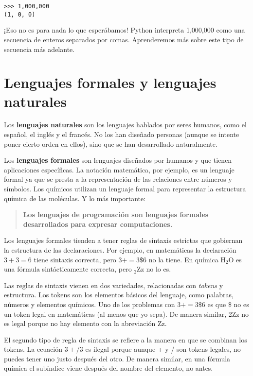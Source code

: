 \documentclass[12pt,letterpaper]{book}
\begin{document}
\begin{lstlisting}
>>> 1,000,000
(1, 0, 0)
\end{lstlisting}

¡Eso no es para nada lo que esperábamos! Python interpreta 1,000,000 como una secuencia de enteros separados por comas. Aprenderemos más sobre este tipo de secuencia más adelante.

\section{Lenguajes formales y lenguajes naturales}

Los \textbf{lenguajes naturales} son los lenguajes hablados por seres humanos, como el español, el inglés y el francés. No los han diseñado personas (aunque se intente poner cierto orden en ellos), sino que se han desarrollado naturalmente.

Los \textbf{lenguajes formales} son lenguajes diseñados por humanos y que tienen aplicaciones específicas. La notación matemática, por ejemplo, es un lenguaje formal ya que se presta a la representación de las relaciones entre números y símbolos. Los químicos utilizan un lenguaje formal para representar la estructura química de las moléculas. Y lo más importante:

\begin{quote}
\textbf{Los lenguajes de programación son lenguajes formales desarrollados para expresar computaciones.}
\end{quote}

Los lenguajes formales tienden a tener reglas de sintaxis estrictas que gobiernan la estructura de las declaraciones. Por ejemplo, en matemáticas la declaración $3 + 3 = 6$ tiene sintaxis correcta, pero $3+ = 3\$6$ no la tiene. En química H$_2$O es una fórmula sintácticamente correcta, pero $_2$Zz no lo es.

Las reglas de sintaxis vienen en dos variedades, relacionadas con \textit{tokens} y estructura. Los tokens son los elementos básicos del lenguaje, como palabras, números y elementos químicos. Uno de los problemas con $3+ = 3\$6$ es que \$ no es un token legal en matemáticas (al menos que yo sepa). De manera similar, 2Zz no es legal porque no hay elemento con la abreviación Zz.

El segundo tipo de regla de sintaxis se refiere a la manera en que se combinan los tokens. La ecuación $3 +/3$ es ilegal porque aunque + y / son tokens legales, no puedes tener uno justo después del otro. De manera similar, en una fórmula química el subíndice viene después del nombre del elemento, no antes.
\end{document}
